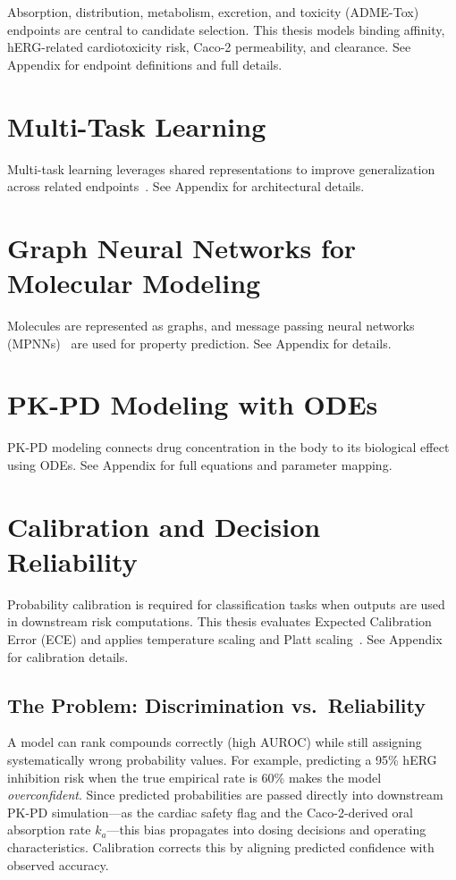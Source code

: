 \documentclass[a4paper,11pt,twoside]{report}
\begin{document}
Absorption, distribution, metabolism, excretion, and toxicity (ADME-Tox) endpoints are central to candidate selection. This thesis models binding affinity, hERG-related cardiotoxicity risk, Caco-2 permeability, and clearance. See Appendix for endpoint definitions and full details.

\section{Multi-Task Learning}


Multi-task learning leverages shared representations to improve generalization across related endpoints~\cite{goodfellow2016}. See Appendix for architectural details.

\section{Graph Neural Networks for Molecular Modeling}


Molecules are represented as graphs, and message passing neural networks (MPNNs)~\cite{gilmer2017mpnn} are used for property prediction. See Appendix for details.

\section{PK-PD Modeling with ODEs}

PK-PD modeling connects drug concentration in the body to its biological effect using ODEs. See Appendix for full equations and parameter mapping.

\section{Calibration and Decision Reliability}


Probability calibration is required for classification tasks when outputs are used in downstream risk computations. This thesis evaluates Expected Calibration Error (ECE) and applies temperature scaling and Platt scaling~\cite{guo2017}. See Appendix for calibration details.

\subsection*{The Problem: Discrimination vs.\ Reliability}

A model can rank compounds correctly (high AUROC) while still assigning systematically wrong probability values. For example, predicting a 95\% hERG inhibition risk when the true empirical rate is 60\% makes the model \textit{overconfident}. Since predicted probabilities are passed directly into downstream PK-PD simulation---as the cardiac safety flag and the Caco-2-derived oral absorption rate $k_a$---this bias propagates into dosing decisions and operating characteristics. Calibration corrects this by aligning predicted confidence with observed accuracy.
\end{document}
